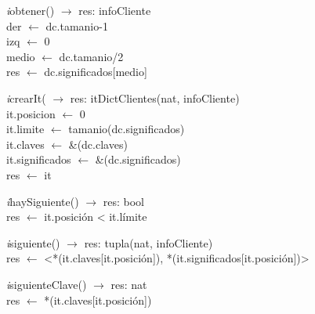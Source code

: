\begin{Representacion}
\begin{Algoritmos}
\begin{algorithm}[H]
\textit{i}obtener() $\longrightarrow$ res: infoCliente\\
\BlankLine
der $\leftarrow$ dc.tamanio-1\\
izq $\leftarrow$ 0\\
medio $\leftarrow$ dc.tamanio/2\\
res $\leftarrow$ dc.significados[medio]\\
\end{algorithm}

\begin{algorithm}[H]
\textit{i}crearIt( $\longrightarrow$ res: itDictClientes(nat, infoCliente)\\
\BlankLine
it.posicion $\leftarrow$ 0\\
it.limite $\leftarrow$ tamanio(dc.significados)\\
it.claves $\leftarrow$ \&(dc.claves)\\
it.significados $\leftarrow$ \&(dc.significados)\\

res $\leftarrow$ it\\
\end{algorithm}

\begin{algorithm}[H]
\textit{i}haySiguiente() $\longrightarrow$ res: bool\\
\BlankLine
res $\leftarrow$ it.posición < it.límite\\
\end{algorithm}

\begin{algorithm}[H]
\textit{i}siguiente() $\longrightarrow$ res: tupla(nat, infoCliente)\\
\BlankLine
res $\leftarrow$ <*(it.claves[it.posición]), *(it.significados[it.posición])>\\
\end{algorithm}

\begin{algorithm}[H]
\textit{i}siguienteClave() $\longrightarrow$ res: nat\\
\BlankLine
res $\leftarrow$ *(it.claves[it.posición])\\
\end{algorithm}


\end{Algoritmos}
\end{Representacion}
